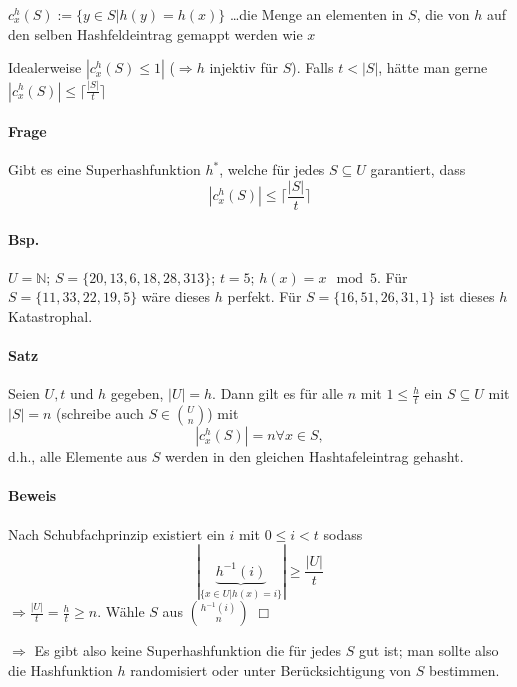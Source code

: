 \par\medskip
$c_x^h(S) := \{ y \in S | h(y) = h(x) \}$ \dots die Menge an elementen in $S$, die von $h$ auf den selben Hashfeldeintrag gemappt werden wie $x$\par\medskip

Idealerweise $|c_x^h(S) \leq 1|$ ($\Rightarrow h$ injektiv für $S$). Falls $t<|S|$, hätte man gerne $|c_x^h(S)| \leq \lceil\frac{|S|}{t}\rceil$\par\medskip

\paragraph*{Frage} Gibt es eine Superhashfunktion $h^*$, welche für jedes $S \subseteq U$ garantiert, dass $$ |c_x^h(S)| \leq \lceil \frac{|S|}{t} \rceil $$

\paragraph*{Bsp.} $U=\mathbb{N}$; $S=\{ 20,13,6,18,28,313 \}$; $t=5$; $h(x)= x \mod 5$. Für $S=\{ 11,33,22,19,5 \}$ wäre dieses $h$ perfekt. Für $S=\{ 16,51,26,31,1 \}$ ist dieses $h$ Katastrophal.

\paragraph*{Satz} Seien $U,t$ und $h$ gegeben, $|U|=h$. Dann gilt es für alle $n$ mit $1 \leq \frac{h}{t}$ ein $S \subseteq U$ mit $|S|=n$ (schreibe auch $S \in {U \choose n} $) mit  $$ |c_x^h(S)| = n \forall x \in S, $$ d.h., alle Elemente aus $S$ werden in den gleichen Hashtafeleintrag gehasht.

\paragraph*{Beweis} Nach Schubfachprinzip existiert ein $i$ mit $0 \leq i < t$ sodass $$ |\underbrace{h^{-1}(i)}_{\{ x \in U | h(x)=i \}}| \geq \frac{|U|}{t} $$ $\Rightarrow \frac{|U|}{t} = \frac{h}{t} \geq n$. Wähle $S$ aus ${h^{-1}(i) \choose n}$ \hspace{8cm} $\Box$

\par\medskip
$\Rightarrow$ Es gibt also keine Superhashfunktion die für jedes $S$ gut ist; man sollte also die Hashfunktion $h$ randomisiert oder unter Berücksichtigung von $S$ bestimmen.\par\medskip